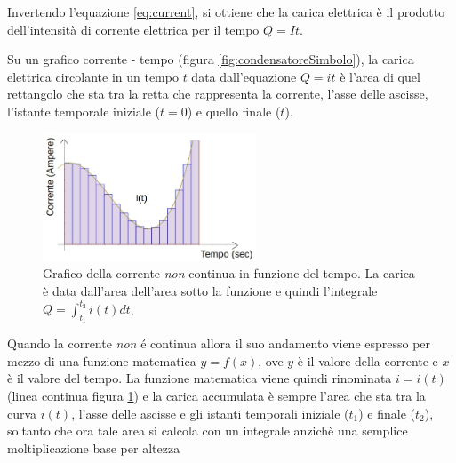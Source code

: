 \documentclass[17pt]{extarticle}
\begin{document}
\begin{enumerate}
Invertendo l'equazione \ref{eq:current}, si ottiene che la carica elettrica è il prodotto dell'intensità di corrente elettrica per il tempo $Q = It$. %



Su un grafico corrente - tempo (figura \ref{fig:condensatoreSimbolo}), la carica elettrica circolante in un tempo $t$ data dall'equazione $Q = it$ è l'area di quel rettangolo che sta tra la retta che rappresenta la corrente, l'asse delle ascisse, l'istante temporale iniziale ($t = 0$) e quello finale ($t$).







\begin{figure}[b!]		
	\centering
   	\includegraphics[width=2.5in]{integraleCorrente.jpg}
  	\caption{Grafico della corrente \emph{non} continua in funzione del tempo. La carica è data dall'area dell'area sotto la funzione e quindi l'integrale $Q =\int_{t_1}^{t_2}i(t)dt$.}
   	\label{fig:integraleCorrente}
\end{figure}%

Quando la corrente \emph{non} \'e continua allora il suo andamento viene espresso per mezzo di una funzione matematica $y = f(x)$, ove $y$ è il valore della corrente e $x$ è il valore del tempo. La funzione matematica viene quindi rinominata $i = i(t)$ (linea continua figura \ref{fig:integraleCorrente}) e la carica accumulata è sempre l'area che sta tra la curva $i(t)$, l'asse delle ascisse e gli istanti temporali iniziale ($t_1$) e finale ($t_2$), soltanto che ora tale area si calcola con un integrale anzichè una semplice moltiplicazione base per altezza






\end{enumerate}
\end{document}
